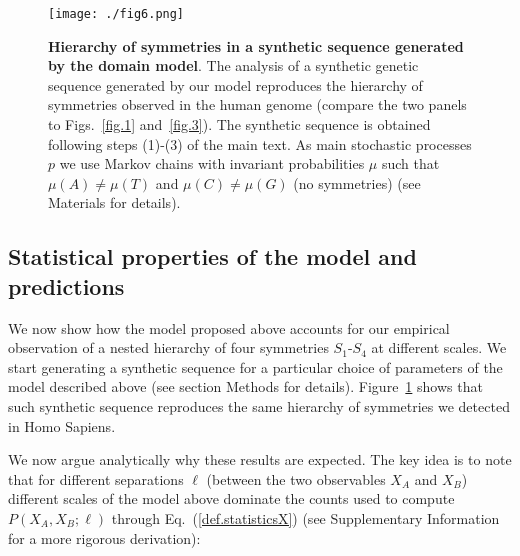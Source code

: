 \documentclass[fleqn,10pt]{wlscirep}
\begin{document}
 \begin{figure}[ht] 
\centering
\texttt{[image: ./fig6.png]}
\caption{ \textbf{Hierarchy of symmetries in a synthetic sequence generated by the domain model}.  The analysis of a synthetic genetic sequence generated by our model reproduces the hierarchy of symmetries observed in the human genome (compare the two panels to Figs.~\ref{fig.1} and~\ref{fig.3}). The synthetic sequence is obtained following steps (1)-(3) of the main text. As  main stochastic processes $p$ we use  Markov chains with invariant probabilities $\mu$ such that $\mu(A) \ne \mu(T) $ and $ \mu(C) \ne \mu(G)$ (no symmetries) (see Materials for details).}
\label{fig.6}
\end{figure}


\subsection*{Statistical properties of the  model and predictions}

We now show how the model proposed above accounts for our empirical observation of a nested hierarchy of four symmetries $S_1$-$S_4$ at different scales. We start generating a synthetic sequence for a particular choice of parameters of the model described above (see  section Methods for details). Figure~\ref{fig.6} shows that such synthetic sequence  reproduces  the same hierarchy of symmetries we detected in Homo Sapiens.

We now argue analytically why these results are expected. The key idea is to note that for different separations $\ell$ (between the two observables $X_A$ and $X_B$) different scales of the model above dominate the counts used to compute $P(X_A,X_B;\ell)$ through Eq.~(\ref{def.statisticsX}) (see Supplementary Information for a more rigorous derivation):
 
\end{document}
